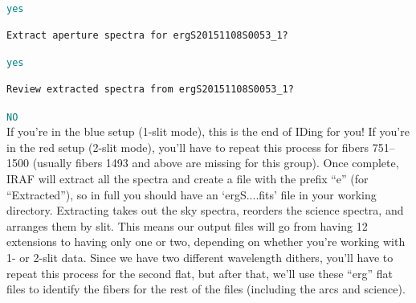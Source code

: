 \documentclass[12pt]{report}
\newcommand{\ty}[1]{\textcolor{teal}{\texttt{#1}}}
\begin{document}
\begin{enumerate}
\ty{yes}

\begin{verbatim}
Extract aperture spectra for ergS20151108S0053_1?
\end{verbatim}

\ty{yes}

\begin{verbatim}
Review extracted spectra from ergS20151108S0053_1?
\end{verbatim}

\ty{NO} \\

If you're in the blue setup (1-slit mode), this is the end of IDing for you! If you're in the red setup (2-slit mode), you'll have to repeat this process for fibers 751--1500 (usually fibers 1493 and above are missing for this group). Once complete, IRAF will extract all the spectra and create a file with the prefix ``e'' (for ``Extracted''), so in full you should have an `ergS....fits' file in your working directory. Extracting takes out the sky spectra, reorders the science spectra, and arranges them by slit. This means our output files will go from having 12 extensions to having only one or two, depending on whether you're working with 1- or 2-slit data. Since we have two different wavelength dithers, you'll have to repeat this process for the second flat, but after that, we'll use these ``erg'' flat files to identify the fibers for the rest of the files (including the arcs and science). 

\end{enumerate}
\end{document}
